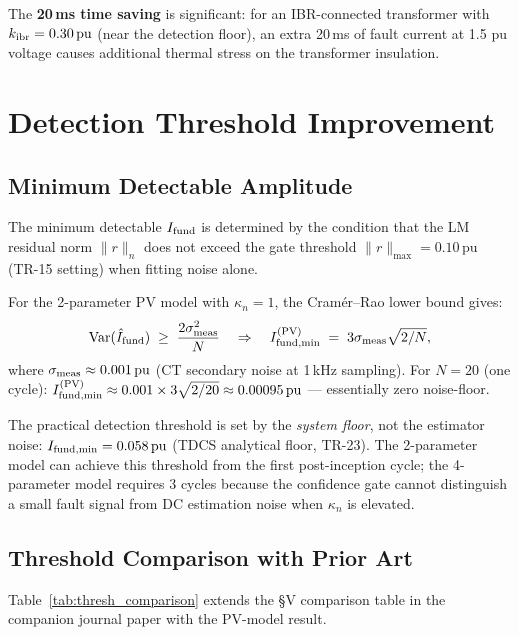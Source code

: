 \documentclass[11pt, a4paper]{article}
\newcommand{\pu}{\,\text{pu}}
\newcommand{\kn}{\kappa_n}
\begin{document}
The \textbf{20\,ms time saving} is significant: for an IBR-connected transformer
with $k_{\rm ibr} = 0.30\pu$ (near the detection floor), an extra 20\,ms
of fault current at 1.5 pu voltage causes additional thermal stress on the
transformer insulation.

\section{Detection Threshold Improvement}
\label{sec:threshold}

\subsection{Minimum Detectable Amplitude}

The minimum detectable $I_{\rm fund}$ is determined by the condition that
the LM residual norm $\|r\|_n$ does not exceed the gate threshold
$\|r\|_{\max} = 0.10\pu$ (TR-15 setting) when fitting noise alone.

For the 2-parameter PV model with $\kn = 1$, the Cramér–Rao lower bound gives:
\begin{equation}
  \text{Var}(\hat{I}_{\rm fund}) \;\geq\; \frac{2\sigma_{\rm meas}^2}{N}
  \quad\Rightarrow\quad
  I_{\rm fund,min}^{(\rm PV)} \;=\; 3\sigma_{\rm meas}\sqrt{2/N},
  \label{eq:thresh_pv}
\end{equation}
where $\sigma_{\rm meas} \approx 0.001\pu$ (CT secondary noise at 1\,kHz sampling).
For $N = 20$ (one cycle): $I_{\rm fund,min}^{(\rm PV)} \approx 0.001 \times 3\sqrt{2/20} \approx 0.00095\pu$ — essentially zero noise-floor.

The practical detection threshold is set by the \emph{system floor}, not the
estimator noise:  $I_{\rm fund,min} = 0.058\pu$ (TDCS analytical floor,
TR-23).  The 2-parameter model can achieve this threshold from the first
post-inception cycle; the 4-parameter model requires 3 cycles because the
confidence gate cannot distinguish a small fault signal from DC estimation
noise when $\kn$ is elevated.

\subsection{Threshold Comparison with Prior Art}

Table~\ref{tab:thresh_comparison} extends the §V comparison table in the
companion journal paper with the PV-model result.
\end{document}
